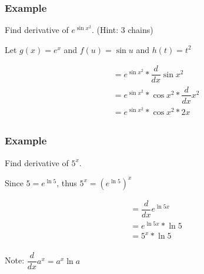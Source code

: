 \documentclass[t]{beamer}
\theoremstyle{plain}
\theoremstyle{definition}
\begin{document}
\frame
{
	\frametitle{Example}
	Find derivative of $e^{\sin{x^2}}$.    (Hint: 3 chains)
	
	\vspace{3em}

	Let $g(x) = e^{x}$ and $f(u) =  \sin{u}$ and $h(t) = t^2$
	
	\begin{align*}
  	&= e^{\sin{x^2}} * \dfrac{d}{dx} \sin{x^2}\\
  	&= e^{\sin{x^2}} * \cos{x^2} * \dfrac{d}{dx} x^2\\
  	&= e^{\sin{x^2}} * \cos{x^2} * 2x\\
	\end{align*}	
	
}

\frame
{
	\frametitle{Example}
	Find derivative of $5^x$. 
	
	\vspace{3em}

	Since $5 = e^{\ln{5}}$, thus $5^x = 	(e^{\ln{5}})^x$
	
	\begin{align*}
  	&= \dfrac{d}{dx} e^{\ln{5} x}\\
  	&= e^{\ln{5}x} * \ln{5}\\
  	&= 5^x * \ln{5}\\ 
	\end{align*}	
	
	Note: $\dfrac{d}{dx} a^x = a^x \ln{a}$
	
}
\end{document}
